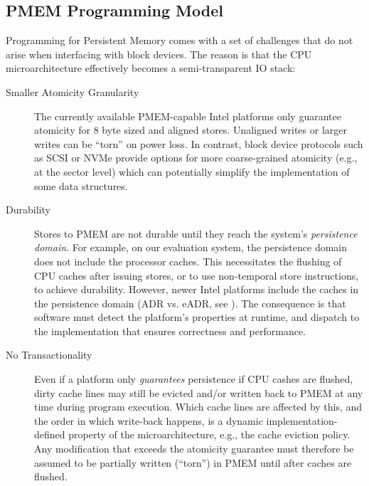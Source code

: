 \documentclass[12pt,a4paper,twoside]{book}
\begin{document}
\subsection{PMEM Programming Model}\label{sec:background:pmemprogrammingmodel}

Programming for Persistent Memory comes with a set of challenges that do not arise when interfacing with block devices.
The reason is that the CPU microarchitecture effectively becomes a semi-transparent IO stack:

\begin{description}
    \item[Smaller Atomicity Granularity] The currently available PMEM-capable Intel platforms only guarantee atomicity for 8 byte sized and aligned stores.
        Unaligned writes or larger writes can be ``torn'' on power loss.
        In contrast, block device protocols such as SCSI or NVMe provide options for more coarse-grained atomicity (e.g., at the sector level) which can potentially simplify the implementation of some data structures.
        \cite{rudoffPersistentMemoryProgramming2017,AreDiskSectorWritesAtomic}

    \item[Durability] Stores to PMEM are not durable until they reach the system's \textit{persistence domain}.
        For example, on our evaluation system, the persistence domain does not include the processor caches.
        This necessitates the flushing of CPU caches after issuing stores, or to use non-temporal store instructions, to achieve durability.
        However, newer Intel platforms include the caches in the persistence domain (ADR vs. eADR, see \cite{EADRNewOpportunities}).
        The consequence is that software must detect the platform's properties at runtime, and dispatch to the implementation that ensures correctness and performance.
        \cite{rudoffPersistentMemoryProgramming2017}

    \item[No Transactionality] Even if a platform only \textit{guarantees} persistence if CPU cashes are flushed, dirty cache lines may still be evicted and/or written back to PMEM at any time during program execution.
        Which cache lines are affected by this, and the order in which write-back happens, is a dynamic implementation-defined property of the microarchitecture, e.g., the cache eviction policy.
        Any modification that exceeds the atomicity guarantee must therefore be assumed to be partially written (``torn'') in PMEM until after caches are flushed.~\cite{Scargall2020}


\end{description}
\end{document}
